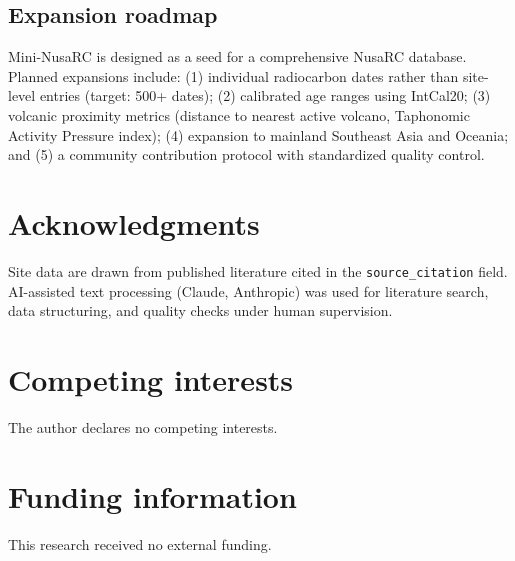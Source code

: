 \documentclass[11pt]{article}
\begin{document}
\subsection{Expansion roadmap}

Mini-NusaRC is designed as a seed for a comprehensive NusaRC database. Planned expansions include: (1) individual radiocarbon dates rather than site-level entries (target: 500+ dates); (2) calibrated age ranges using IntCal20; (3) volcanic proximity metrics (distance to nearest active volcano, Taphonomic Activity Pressure index); (4) expansion to mainland Southeast Asia and Oceania; and (5) a community contribution protocol with standardized quality control.

\section*{Acknowledgments}

Site data are drawn from published literature cited in the \texttt{source\_citation} field. AI-assisted text processing (Claude, Anthropic) was used for literature search, data structuring, and quality checks under human supervision.

\section*{Competing interests}

The author declares no competing interests.

\section*{Funding information}

This research received no external funding.



\end{document}

